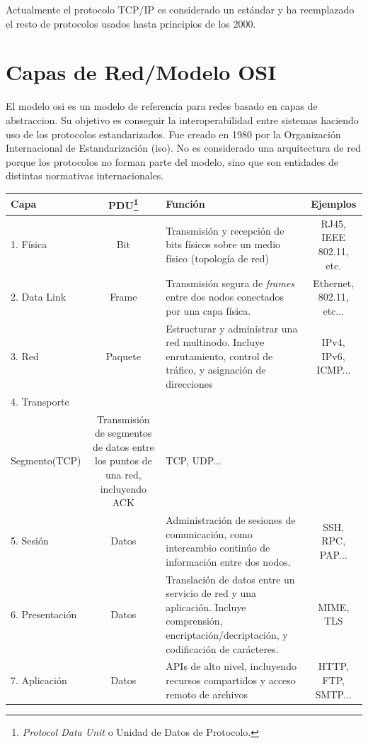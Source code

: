 \documentclass[a4paper, 11pt]{report} %
\begin{document}
Actualmente el protocolo TCP/IP es considerado un estándar y ha reemplazado el resto de protocolos usados hasta principios de los 2000.

\newpage

\section{Capas de Red/Modelo OSI}
El modelo \acrshort{osi} es un modelo de referencia para redes basado en \gls{capas de abstraccion}.
Su objetivo es conseguir la interoperabilidad entre sistemas haciendo uso de los protocolos estandarizados. Fue creado en 1980 por la Organización Internacional de Estandarización (\acrshort{iso}). No es considerado una arquitectura de red porque los protocolos no forman parte del modelo, sino que son entidades de distintas normativas internacionales.
\vspace*{20pt}

\renewcommand{\arraystretch}{1} %
\noindent\linespread{1}
\begin{tabularx}{\linewidth}{ | l >{\small}c >{\small}X >{\small}c | }
	\rowcolor{header} \hline
	\textbf{Capa} & \textbf{PDU\footnote{\textit{Protocol Data Unit} o Unidad de Datos de Protocolo.}} & \textbf{Función} & \textbf{Ejemplos} \\ \hline
	1. Física & Bit & Transmisión y recepción de bits físicos sobre un medio físico (topología de red) & 	 RJ45, IEEE 802.11, etc. \\
	\label{osi}
	2. Data Link & Frame & Transmisión segura de \textit{frames} entre dos nodos conectados por una capa física. & Ethernet, 802.11, etc...\\
	3. Red & Paquete & Estructurar y administrar una red multinodo. Incluye enrutamiento, control de tráfico, y asignación de direcciones & IPv4, IPv6, ICMP... \\
	4. Transporte & \begin{tabular}[t]{@{}c@{}}Datagrama(UDP)\\Segmento(TCP)  \end{tabular} &
	Transmisión de segmentos de datos entre los puntos de una red, incluyendo ACK & TCP, UDP...\\
	5. Sesión & Datos & Administración de sesiones de comunicación, como intercambio continúo de información entre dos nodos. & SSH, RPC, PAP...\\ 
	6. Presentación & Datos & Translación de datos entre un servicio de red y una aplicación. Incluye comprensión, encriptación/decriptación, y codificación de carácteres. & MIME, TLS \\
	7. Aplicación & Datos & APIs de alto nivel, incluyendo recursos compartidos y acceso remoto de archivos & HTTP, FTP, SMTP... \\ \hline
\end{tabularx}
\end{document}
